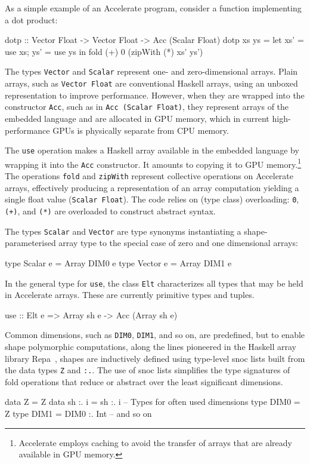 \documentclass{llncs}
\begin{document}
As a simple example of an Accelerate program, consider a function implementing a dot product:
%
\begin{hcode}
dotp :: Vector Float -> Vector Float -> Acc (Scalar Float)
dotp xs ys = let { xs' = use xs; ys' = use ys }
             in  fold (+) 0 (zipWith (*) xs' ys')
\end{hcode}
%
The types \verb+Vector+ and \verb+Scalar+ represent one- and zero-dimensional
arrays. Plain arrays, such as \verb+Vector Float+ are conventional Haskell arrays, using an unboxed representation to improve performance. However, when they are wrapped into the constructor \verb+Acc+, such as in \verb+Acc (Scalar Float)+, they represent arrays of the embedded language and are allocated in GPU memory, which in current high-performance GPUs is physically separate from CPU memory.

The \verb+use+ operation makes a Haskell array available in the
embedded language by wrapping it into the \verb+Acc+ constructor. It
amounts to copying it to GPU memory.\footnote{Accelerate employs
  caching to avoid the transfer of arrays that are already
  available in GPU memory.} The operations \texttt{fold} and
\texttt{zipWith} represent collective operations on Accelerate arrays,
effectively producing a representation of an array computation
yielding  a single float value (\texttt{Scalar Float}). The code relies on (type class) overloading: \texttt{0}, \texttt{(+)}, and
\texttt{(*)} are overloaded to construct abstract syntax. 

The types \verb+Scalar+ and \verb+Vector+ are type synonyms instantiating a shape-parameterised array type to the special case of zero and one dimensional arrays:
%
\begin{hcode}
type Scalar e = Array DIM0 e
type Vector e = Array DIM1 e
\end{hcode}

In the general type for \verb+use+, the class \verb+Elt+ characterizes all types that may be held in Accelerate arrays. These are currently primitive types and tuples.
%
\begin{hcode}
use :: Elt e => Array sh e -> Acc (Array sh e)
\end{hcode}
%
Common dimensions, such as \verb+DIM0+, \verb+DIM1+, and so on, are
predefined, but to enable shape polymorphic computations, along the
lines pioneered in the Haskell array library
Repa~\cite{keller-etal:repa}, shapes are inductively defined using
type-level snoc lists built from the data types \texttt{Z} and
\texttt{:.}. The use of snoc lists simplifies the type signatures of
fold operations that reduce or abstract over the least significant dimensions.
%
\begin{hcode}
data Z       = Z
data sh :. i = sh :. i
-- Types for often used dimensions
type DIM0 = Z
type DIM1 = DIM0 :. Int
-- and so on
\end{hcode}
\end{document}
